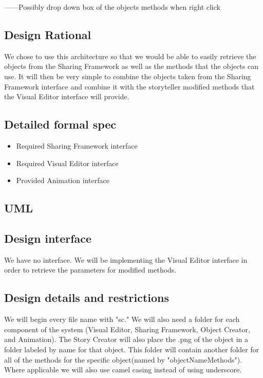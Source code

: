 \documentclass[12pt]{article}
\begin{document}
------Possibly drop down box of the objects methods when right click

\subsection{Design Rational}
We chose to use this architecture so that we would be able to easily retrieve the objects from the Sharing Framework as well as the methods that the objects can use.  It will then be very simple to combine the objects taken from the Sharing Framework interface and combine it with the storyteller modified methods that the Visual Editor interface will provide.  

\subsection{Detailed formal spec}
\begin{itemize}
	\item Required Sharing Framework interface
	\item Required Visual Editor interface
	\item Provided Animation interface
\end{itemize}
\subsection{UML}

\subsection{Design interface}
We have no interface.  We will be implementing the Visual Editor interface in order to retrieve the parameters for modified methods.

\subsection{Design details and restrictions}
We will begin every file name with "sc."  We will also need a folder for each component of the system (Visual Editor, Sharing Framework, Object Creator, and Animation).  The Story Creator will also place the .png of the object in a folder labeled by name for that object.  This folder will contain another folder for all of the methods for the specific object(named by "objectNameMethods").  Where applicable we will also use camel casing instead of using underscore.
\end{document}
